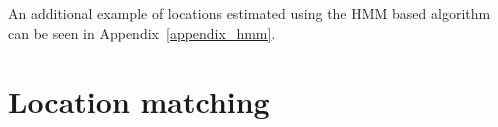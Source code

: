An additional example of locations estimated using the HMM based algorithm can
be seen in Appendix~\ref{appendix_hmm}.

\section{Location matching}

